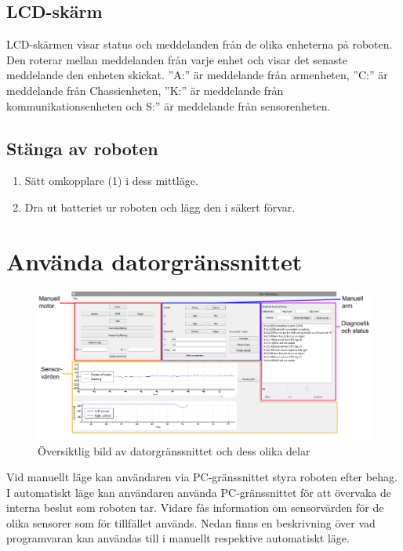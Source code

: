 \documentclass[a4paper,12pt]{article}
\begin{document}
\subsection{LCD-skärm}
LCD-skärmen visar status och meddelanden från de olika enheterna på roboten. Den roterar mellan meddelanden från varje enhet och visar det senaste meddelande den enheten skickat. ''A:'' är meddelande från armenheten, ''C:'' är meddelande från Chassienheten, ''K:'' är meddelande från kommunikationsenheten och S:'' är meddelande från sensorenheten. 

\subsection{Stänga av roboten}
\begin{enumerate}
\item Sätt omkopplare (1) i dess mittläge.
\item Dra ut batteriet ur roboten och lägg den i säkert förvar.
\end{enumerate}
%
%
\section{Använda datorgränssnittet}

\begin{figure}[H]
	\centering
	\includegraphics[width=1.0\textwidth]{PC_manual.pdf}
	\caption{Översiktlig bild av datorgränssnittet och dess olika delar}
	\label{fig:pc_oversikt}
\end{figure}

Vid manuellt läge kan användaren via PC-gränssnittet styra roboten efter behag. I automatiskt läge kan användaren använda PC-gränssnittet för att övervaka de interna beslut som roboten tar. Vidare fås  information om sensorvärden för de olika sensorer som för tillfället används. Nedan finns en beskrivning över vad programvaran kan användas till i manuellt respektive automatiskt läge. 
\end{document}
